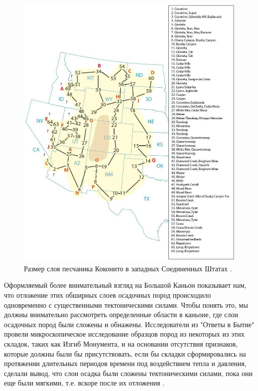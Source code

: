 \documentclass[10pt,twocolumn,letterpaper]{article}
\begin{document}
\begin{figure}[t]
\begin{center}
   \includegraphics[width=1\linewidth]{coconino.jpg}
\end{center}
   \caption{Размер слоя песчаника Коконито в западных Соединенных Штатах \cite{21}.}
\label{fig:3}
\label{fig:onecol}
\end{figure}

Оформляемый более внимательный взгляд на Большой Каньон показывает нам, что отложение этих обширных слоев осадочных пород происходило одновременно с существенными тектоническими силами. Чтобы понять это, мы должны внимательно рассмотреть определенные области в каньоне, где слои осадочных пород были сложены и обнажены. Исследователи из "Ответы в Бытие" \cite{42} провели микроскопическое исследование образцов пород из некоторых из этих складок, таких как Изгиб Монумента, и на основании отсутствия признаков, которые должны были бы присутствовать, если бы складки сформировались на протяжении длительных периодов времени под воздействием тепла и давления, сделали вывод, что слои осадка были сложены тектоническими силами, пока они еще были мягкими, т.е. вскоре после их отложения \cite{43}.
\end{document}
